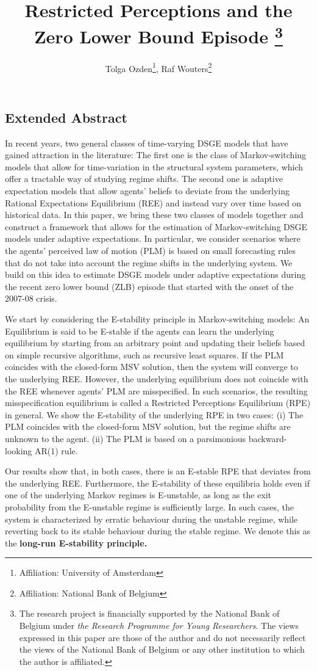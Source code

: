 \documentclass[12pt,reqno]{article}
\title{Restricted Perceptions and the Zero Lower Bound Episode \footnote{The research project is financially supported by the National Bank of Belgium under \textit{the Research Programme for Young Researchers}. The views expressed in this paper are those of the author and do not necessarily reflect the views 
of the National Bank of Belgium or any other institution to which the author is affiliated.}}
\author{Tolga Ozden\footnote{Affiliation: University of Amsterdam}, Raf Wouters\footnote{Affiliation: National Bank of Belgium}}
\numberwithin{equation}{section}
\begin{document}
\maketitle

\subsection*{Extended Abstract}

In recent years, two general classes of time-varying DSGE models that have gained attraction in the literature: The first one 
is the class of Markov-switching models that allow for time-variation in the structural system parameters, which offer a tractable way of studying 
regime shifts. The second one is adaptive expectation models that allow agents' beliefs to deviate from the underlying Rational Expectations
Equilibrium (REE) and instead vary over time based on historical data. In this paper, we bring these two classes of models together and construct a framework that allows for the estimation of Markov-switching DSGE models under adaptive expectations.
In particular, we consider scenarios where the agents' perceived law of motion (PLM) is based on small forecasting rules that do not take
into account the regime shifts in the underlying system. We build on this idea to estimate DSGE models under adaptive expectations during 
the recent zero lower bound (ZLB) episode that started with the onset of the 2007-08 crisis.

We start by considering the E-stability principle in Markov-switching models: An Equilibrium is said to be E-stable 
if the agents can learn the underlying equilibrium by starting from an arbitrary point and updating their beliefs based on simple 
recursive algorithms, such as recursive least squares. If the PLM coincides with the closed-form MSV solution, then the system will 
converge to the underlying REE. However, the underlying equilibrium does not coincide with the REE whenever agents' PLM are misspecified.
In such scenarios, the resulting misspecification equilibrium is called a Restricted Perceptions Equilibrium (RPE) in general. We show the E-stability
of the underlying RPE in two cases:
(i) The PLM coincides with the closed-form MSV solution, but the regime shifts are unknown to the agent. 
(ii) The PLM is based on a parsimonious backward-looking AR(1) rule.

Our results show that, in both cases, there is an E-stable RPE that deviates from the underlying REE. Furthermore, the E-stability of 
these equilibria holds even if one of the underlying Markov regimes is E-unstable, as long as the exit probability from the E-unstable
regime is sufficiently large. In such cases, the system is characterized by erratic behaviour during the unstable regime, while reverting
back to its stable behaviour during the stable regime. We denote this as the \textbf{long-run E-stability principle.} \\
\end{document}
